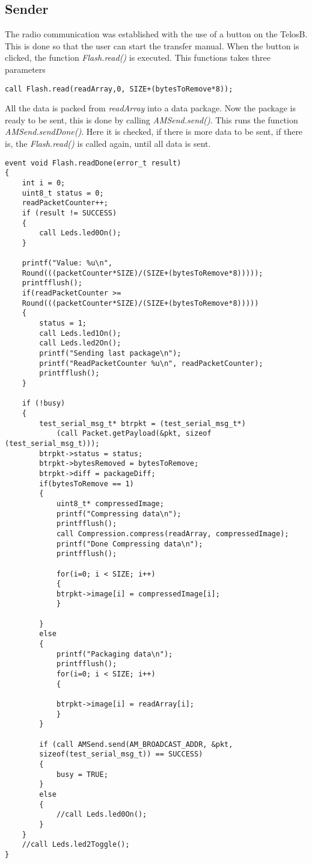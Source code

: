 \subsection{Sender}
The radio communication was established with the use of a button on the TelosB. This is done so that the 
user can start the transfer manual. When the button is clicked, the function \emph{Flash.read()} is executed. This functions takes three parameters

\begin{lstlisting}[caption={The function Flash.read}, label=lst:fread]
call Flash.read(readArray,0, SIZE+(bytesToRemove*8));
\end{lstlisting}

All the data is packed from \emph{readArray} into a data package. Now the package is ready to be sent, this is done by calling \emph{AMSend.send()}. This runs the function \emph{AMSend.sendDone()}. Here it is checked, if there is more data to be sent, if there is, the \emph{Flash.read()} is called again, until all data is sent. 

\begin{lstlisting}[caption={the function Flash.ReadDone}, label=lst:freaddone]
event void Flash.readDone(error_t result)
{	
	int i = 0;
	uint8_t status = 0;		
	readPacketCounter++;	
	if (result != SUCCESS)
	{
		call Leds.led0On();
	}		
	
	printf("Value: %u\n",
	Round(((packetCounter*SIZE)/(SIZE+(bytesToRemove*8)))));
	printfflush();
	if(readPacketCounter >=
	Round(((packetCounter*SIZE)/(SIZE+(bytesToRemove*8)))))
	{
		status = 1;
		call Leds.led1On();
		call Leds.led2On();
		printf("Sending last package\n");
		printf("ReadPacketCounter %u\n", readPacketCounter);
		printfflush();
	}
	
	if (!busy) 
	{
		test_serial_msg_t* btrpkt = (test_serial_msg_t*)
			(call Packet.getPayload(&pkt, sizeof (test_serial_msg_t)));
		btrpkt->status = status;
		btrpkt->bytesRemoved = bytesToRemove;
		btrpkt->diff = packageDiff;
		if(bytesToRemove == 1)
		{
			uint8_t* compressedImage;
			printf("Compressing data\n");
			printfflush();
			call Compression.compress(readArray, compressedImage);
			printf("Done Compressing data\n");
			printfflush();
			
			for(i=0; i < SIZE; i++)
			{
			btrpkt->image[i] = compressedImage[i];
			}
		
		}
		else
		{
			printf("Packaging data\n");
			printfflush();
			for(i=0; i < SIZE; i++)
			{
			
			btrpkt->image[i] = readArray[i];   	
			}	
		}
		
		if (call AMSend.send(AM_BROADCAST_ADDR, &pkt,
		sizeof(test_serial_msg_t)) == SUCCESS) 
		{
			busy = TRUE;
		}
		else
		{
			//call Leds.led0On();
		}
	}
	//call Leds.led2Toggle();
}
\end{lstlisting}

